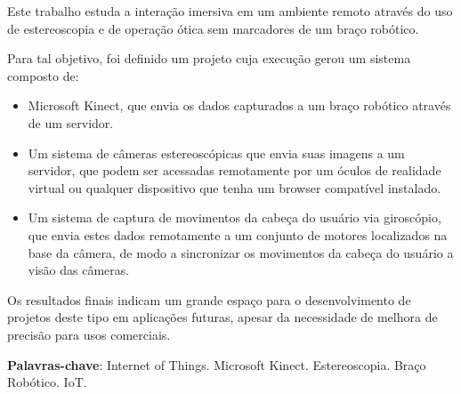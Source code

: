 
\setlength{\absparsep}{18pt} %
\begin{resumo}
	Este trabalho estuda a interação imersiva em um ambiente remoto através do uso de estereoscopia e de operação ótica sem marcadores de um braço robótico.
	
	Para tal objetivo, foi definido um projeto cuja execução gerou um sistema composto de:
	\begin{itemize}
		\item Microsoft Kinect, que envia os dados capturados a um braço robótico através de um servidor.
		\item Um sistema de câmeras estereoscópicas que envia suas imagens a um servidor, que podem ser acessadas remotamente por um óculos de realidade virtual ou qualquer dispositivo que tenha um browser compatível instalado.
		\item Um sistema de captura de movimentos da cabeça do usuário via giroscópio, que envia estes dados remotamente a um conjunto de motores localizados na base da câmera, de modo a sincronizar os movimentos da cabeça do usuário a visão das câmeras.		
	\end{itemize}

	 Os resultados finais indicam um grande espaço para o desenvolvimento de projetos deste tipo em aplicações futuras, apesar da necessidade de melhora de precisão para usos comerciais.
	
	\textbf{Palavras-chave}: Internet of Things. Microsoft Kinect. Estereoscopia. Braço Robótico. IoT. 
\end{resumo}

